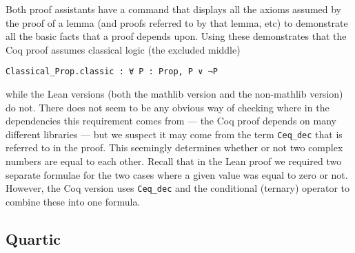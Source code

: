 \documentclass{article} %
\theoremstyle{plain}
\theoremstyle{definition}
\newcommand{\Lean}{\textsf{Lean}\xspace}
\newcommand{\mathlib}{\textsf{mathlib}\xspace}
\begin{document}
Both proof assistants have a command that displays all the axioms assumed by the proof of a lemma (and proofs referred to by that lemma, etc)
to demonstrate all the basic facts that a proof depends upon.
Using these demonstrates that the Coq proof assumes classical logic (the excluded middle)
\begin{lstlisting}
Classical_Prop.classic : ∀ P : Prop, P ∨ ¬P
\end{lstlisting}
while the \Lean versions (both the \mathlib version and the non-mathlib version) do not.
There does not seem to be any obvious way of checking where in the dependencies this requirement comes from ---
the Coq proof depends on many different libraries --- but we suspect it may come from the term \lstinline{Ceq_dec} that is referred to in the proof.
This seemingly determines whether or not two complex numbers are equal to each other.
Recall that
in the \Lean proof we required two separate formulae for the two cases where a given value was equal to zero or not.
However, the Coq version uses \lstinline{Ceq_dec} and the conditional (ternary) operator to combine these into one formula.

\subsection{Quartic}
\label{sec:coqcomp:quartic}
\end{document}
